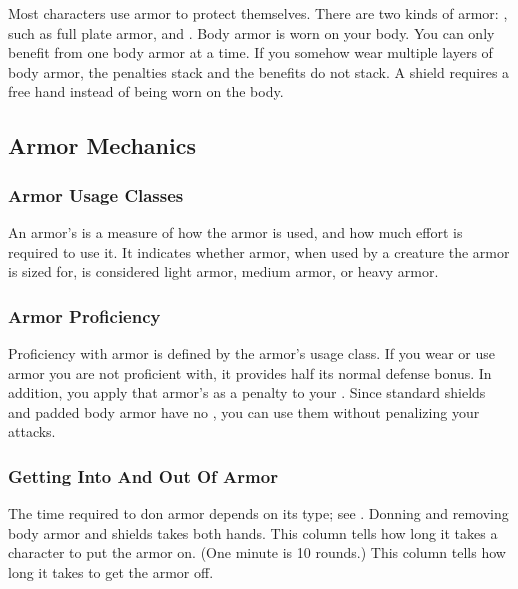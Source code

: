       

      \newpage
{}

  Most characters use armor to protect themselves. There are two kinds of armor: , such as full plate armor, and .
  Body armor is worn on your body.
  You can only benefit from one body armor at a time.
  If you somehow wear multiple layers of body armor, the penalties stack and the benefits do not stack.
  A shield requires a free hand instead of being worn on the body.

  \subsection{Armor Mechanics}

    \subsubsection{Armor Usage Classes}\label{Armor Usage Classes}
      An armor's  is a measure of how the armor is used, and how much effort is required to use it.
      It indicates whether armor, when used by a creature the armor is sized for, is considered light armor, medium armor, or heavy armor.

    \subsubsection{Armor Proficiency}\label{Armor Proficiency}
      Proficiency with armor is defined by the armor's usage class.
      If you wear or use armor you are not proficient with, it provides half its normal defense bonus.
      In addition, you apply that armor's  as a penalty to your .
      Since standard shields and padded body armor have no , you can use them without penalizing your attacks.

    \subsubsection{Getting Into And Out Of Armor}
      The time required to don armor depends on its type; see . Donning and removing body armor and shields takes both hands.
       This column tells how long it takes a character to put the armor on. (One minute is 10 rounds.)
       This column tells how long it takes to get the armor off.

